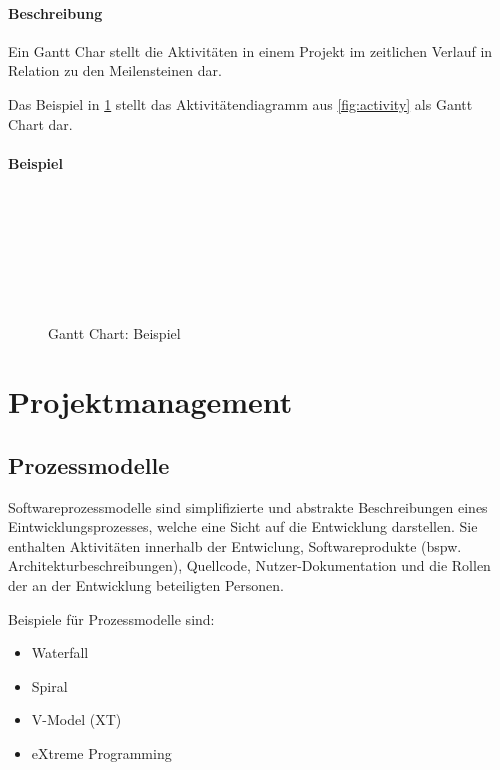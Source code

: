 \documentclass[a4paper, 11pt, accentcolor = tud3b]{tudreport}
\begin{document}
				\paragraph{Beschreibung}
					Ein Gantt Char stellt die Aktivitäten in einem Projekt im zeitlichen Verlauf in Relation zu den Meilensteinen dar.
					
					Das Beispiel in \ref{fig:gantt} stellt das Aktivitätendiagramm aus \ref{fig:activity} als Gantt Chart dar.
				
				\paragraph{Beispiel}
					\begin{figure}[ht]
						\centering
						\begin{ganttchart}[vgrid]{1}{21}
							\\
							 \\
							 \\
							 \\
							 \\
							 \\
						\end{ganttchart}
						\caption{Gantt Chart: Beispiel}
						\label{fig:gantt}
					\end{figure}
	
		\section{Projektmanagement}
			\subsection{Prozessmodelle}
				Softwareprozessmodelle sind simplifizierte und abstrakte Beschreibungen eines Eintwicklungsprozesses, welche eine Sicht auf die Entwicklung darstellen. Sie enthalten Aktivitäten innerhalb der Entwiclung, Softwareprodukte (bspw. Architekturbeschreibungen), Quellcode, Nutzer-Dokumentation und die Rollen der an der Entwicklung beteiligten Personen.
				
				Beispiele für Prozessmodelle sind:
				\begin{itemize}
					\item Waterfall
					\item Spiral
					\item V-Model (XT)
					\item eXtreme Programming
				\end{itemize}
			
\end{document}
